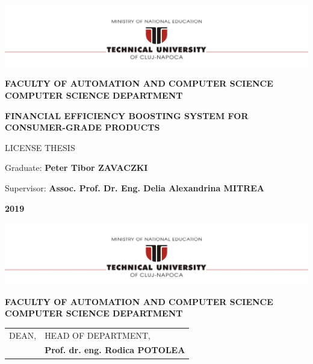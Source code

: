 \documentclass[12pt,a4paper,twoside]{report}
\renewcommand{\thesisauthor}{Peter Tibor ZAVACZKI}    %
\renewcommand{\thesisyear}{2019}      %
\renewcommand{\thesistitle}{FINANCIAL EFFICIENCY BOOSTING SYSTEM FOR CONSUMER-GRADE PRODUCTS}
\renewcommand{\thesissupervisor}{Assoc. Prof. Dr. Eng. Delia Alexandrina MITREA}
\newcommand{\department}{\bf FACULTY OF AUTOMATION AND COMPUTER SCIENCE\\
COMPUTER SCIENCE DEPARTMENT}
\newcommand{\thesis}{LICENSE THESIS}
\newcommand{\utcnlogo}{\includegraphics[width=15cm]{img/tucn.jpg}}
\begin{document}

\newenvironment{definition}[1][Defini\c{t}ie.]{\begin{trivlist}
    \item[\hskip \labelsep {\bfseries #1}]}{\end{trivlist}}




\setcounter{secnumdepth}{3}

\setcounter{page}{1}

\begin{center}
  \utcnlogo

  \department

  \vspace{4cm}

  {\bf \thesistitle} %

  \vspace{1.5cm}

  \thesis

  \vspace{5.75cm}

  Graduate: {\bf \thesisauthor}

  Supervisor: {\bf \thesissupervisor}

  \vspace{3cm}
  {\bf \thesisyear}
\end{center}

\thispagestyle{empty}
\newpage

\begin{center}
  \utcnlogo

  \department

\end{center}
\vspace{0.5cm}

\begin{tabular}{p{7cm}p{8cm}}
  \hspace{-1cm}DEAN,                             & HEAD OF DEPARTMENT,                 \\
  \hspace{-1cm}{\bf Prof. dr. eng. Liviu MICLEA} & {\bf Prof. dr. eng. Rodica POTOLEA} \\
\end{tabular}
\end{document}
